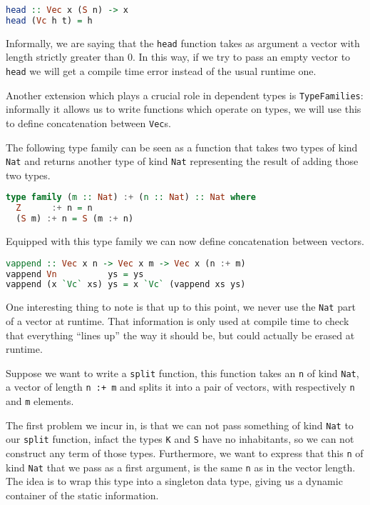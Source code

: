\documentclass[11pt]{article}
\begin{document}
\begin{lstlisting}[language=haskell]
head :: Vec x (S n) -> x
head (Vc h t) = h
\end{lstlisting}

Informally, we are saying that the \texttt{head} function takes as
argument a vector with length strictly greater than 0. In this way, if we
try to pass an empty vector to \texttt{head} we will get a compile time
error instead of the usual runtime one.

Another extension which plays a crucial role in dependent types is
\texttt{TypeFamilies}: informally it allows us to write functions which operate on types, 
we will use this to define concatenation between \texttt{Vec}s.

The following type family can be seen as a function that takes two types
of kind \texttt{Nat} and returns another type of kind \texttt{Nat}
representing the result of adding those two types.

\begin{lstlisting}[language=haskell]
type family (m :: Nat) :+ (n :: Nat) :: Nat where
  Z      :+ n = n
  (S m) :+ n = S (m :+ n)
\end{lstlisting}

Equipped with this type family we can now define concatenation between
vectors.

\begin{lstlisting}[language=haskell]
vappend :: Vec x n -> Vec x m -> Vec x (n :+ m)
vappend Vn          ys = ys
vappend (x `Vc` xs) ys = x `Vc` (vappend xs ys)
\end{lstlisting}

One interesting thing to note is that up to this point, we never use the
\texttt{Nat} part of a vector at runtime. That information is only used
at compile time to check that everything ``lines up'' the way it should
be, but could actually be erased at runtime.

Suppose we want to write a \texttt{split} function, this function takes
an \texttt{n} of kind \texttt{Nat}, a vector of length \texttt{n\ :+\ m}
and splits it into a pair of vectors, with respectively \texttt{n} and
\texttt{m} elements.

The first problem we incur in, is that we can not pass something of kind
\texttt{Nat} to our \texttt{split} function, infact the types \texttt{K} and \texttt{S} have no inhabitants, so we can
not construct any term of those types. Furthermore, we want to
express that this \texttt{n} of kind \texttt{Nat} that we pass as a
first argument, is the same \texttt{n} as in the vector length. The idea is to 
wrap this type into a singleton data type, giving us a dynamic container of the static 
information.
\end{document}
